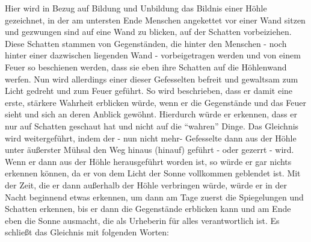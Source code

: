 Hier wird in Bezug auf Bildung und Unbildung das Bildnis einer Höhle gezeichnet, in der am untersten Ende Menschen angekettet vor einer Wand sitzen und gezwungen sind auf eine Wand zu blicken, auf der Schatten vorbeiziehen. Diese Schatten stammen von Gegenständen, die hinter den Menschen - noch hinter einer dazwischen liegenden Wand - vorbeigetragen werden und von einem Feuer so beschienen werden, dass sie eben ihre Schatten auf die Höhlenwand werfen. Nun wird allerdings einer dieser Gefesselten befreit und gewaltsam zum Licht gedreht und zum Feuer geführt. So wird beschrieben, dass er damit eine erste, stärkere Wahrheit erblicken würde, wenn er die Gegenstände und das Feuer sieht und sich an deren Anblick gewöhnt. Hierdurch würde er erkennen, dass er nur auf Schatten geschaut hat und nicht auf die \enquote{wahren} Dinge. Das Gleichnis wird weitergeführt, indem der - nun nicht mehr- Gefesselte dann aus der Höhle unter äußerster Mühsal den Weg hinaus (hinauf) geführt - oder gezerrt - wird. Wenn er dann aus der Höhle herausgeführt worden ist, so würde er gar nichts erkennen können, da er von dem Licht der Sonne vollkommen geblendet ist. Mit der Zeit, die er dann außerhalb der Höhle verbringen würde, würde er in der Nacht beginnend etwas erkennen, um dann am Tage zuerst die Spiegelungen und Schatten erkennen, bis er dann die Gegenstände erblicken kann und am Ende eben die Sonne ausmacht, die als Urheberin für alles verantwortlich ist. 
Es schließt das Gleichnis mit folgenden Worten:

